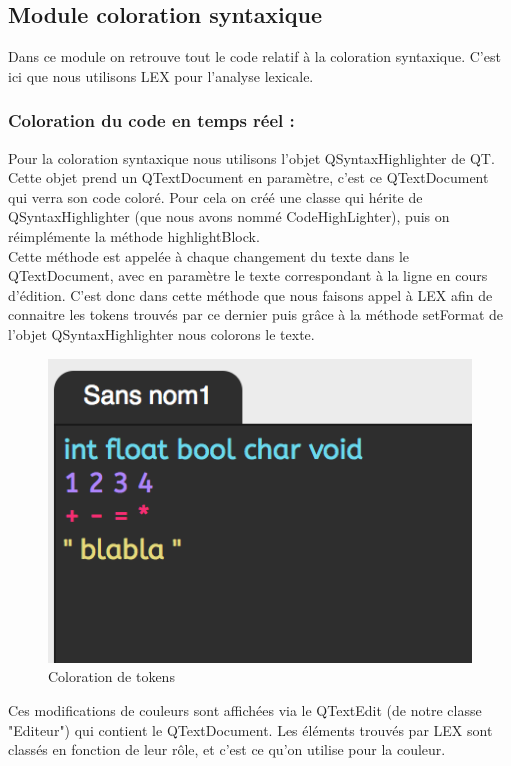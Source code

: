 \documentclass[a4paper,12pt]{article}
\begin{document}
		\subsection{Module coloration syntaxique}	
		
		Dans ce module on retrouve tout le code relatif à la coloration syntaxique. C’est ici que nous utilisons LEX pour l’analyse lexicale.  
		\subsubsection*{Coloration du code en temps réel :}

	Pour la coloration syntaxique nous utilisons l’objet QSyntaxHighlighter de QT. Cette objet prend un QTextDocument en paramètre, c’est ce QTextDocument qui verra son code coloré. Pour cela on créé une classe qui hérite de QSyntaxHighlighter (que nous avons nommé CodeHighLighter), puis on réimplémente la méthode highlightBlock.\\
	 Cette méthode est appelée à chaque changement du texte dans le QTextDocument, avec en paramètre le texte correspondant à la ligne en cours d’édition. C’est donc dans cette méthode que nous faisons appel à LEX afin de connaitre les tokens trouvés par ce dernier puis grâce à la méthode setFormat de l’objet QSyntaxHighlighter nous colorons le texte.
	 
	 \begin{figure}[h!]
			\begin{center}
				\includegraphics[scale=1]{images/color}
				\caption{Coloration de tokens}
			\end{center}
		\end{figure}
		
		Ces modifications de couleurs sont affichées via le QTextEdit (de notre classe "Editeur") qui contient le QTextDocument. Les éléments trouvés par LEX sont classés en fonction de leur rôle, et c'est ce qu'on utilise pour la couleur.
\end{document}
